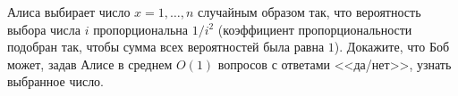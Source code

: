 Алиса выбирает число $x = 1, \dots, n$ случайным образом так, что вероятность выбора числа $i$
пропорциональна $1 / i^2$ (коэффициент пропорциональности подобран так, чтобы сумма всех вероятностей
была равна $1$). Докажите, что Боб может, задав Алисе в среднем $O(1)$ вопросов с ответами <<да/нет>>,
узнать выбранное число.